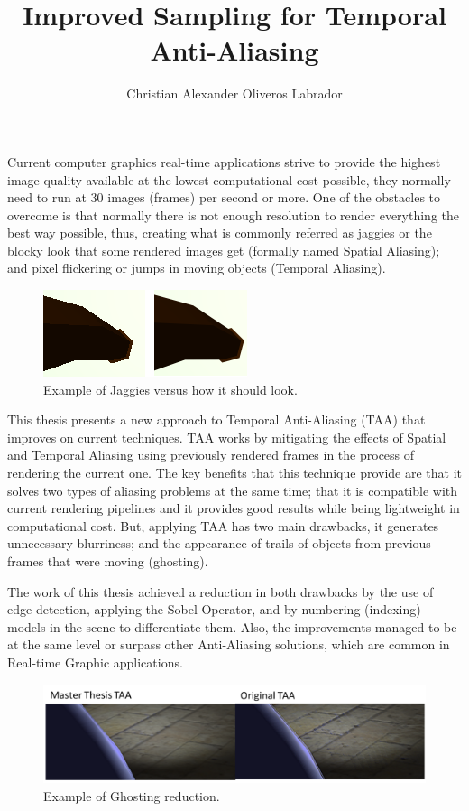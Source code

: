 \documentclass{popsci}
\author{Christian Alexander Oliveros Labrador}
\title{Improved Sampling for Temporal Anti-Aliasing}
\begin{document}


{\noindent Current computer graphics real-time applications strive to provide the highest image quality available at the lowest computational cost possible, they normally need to run at 30 images (frames) per second or more. One of the obstacles to overcome is that normally there is not enough resolution to render everything the best way possible, thus, creating what is commonly referred as jaggies or the blocky look that some rendered images get (formally named Spatial Aliasing); and pixel flickering or jumps in moving objects (Temporal Aliasing).   
	
\begin{figure}[!hbt]
	\centering
	\includegraphics[scale=1.0]{images/pipe_sobel_no_aa.png}
	\caption{Example of Jaggies versus how it should look.}\label{fig:jaggies}
\end{figure}
	
This thesis presents a new approach to Temporal Anti-Aliasing (TAA) that improves on current techniques. TAA works by mitigating the effects of Spatial and Temporal Aliasing using previously rendered frames in the process of rendering the current one. The key benefits that this technique provide are that it solves two types of aliasing problems at the same time; that it is compatible with current rendering pipelines and it provides good results while being lightweight in computational cost. But, applying TAA has two main drawbacks, it generates unnecessary blurriness; and the appearance of trails of objects from previous frames that were moving (ghosting). 

The work of this thesis achieved a reduction in both drawbacks by the use of edge detection, applying the Sobel Operator, and by numbering (indexing) models in the scene to differentiate them. Also, the improvements managed to be at the same level or surpass other Anti-Aliasing solutions, which are common in Real-time Graphic applications.

\begin{figure}[!hbt]
	\centering
	\includegraphics[scale=0.65]{images/ghosting.png}
	\caption{Example of Ghosting reduction.}\label{fig:ghosting}
\end{figure}
	
}
\end{document}
